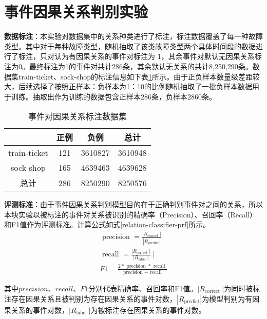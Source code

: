\section{事件因果关系判别实验}
\textbf{数据标注}：本实验对数据集中的关系种类进行了标注，标注数据覆盖了每一种故障类型。其中对于每种故障类型，随机抽取了该类故障类型两个具体时间段的数据进行了标注，只对认为有因果关系的事件对标注为
1，其余事件对默认无因果关系标注为0。最终标注为1的事件对共计286条，其余默认无关系的共计8,250,290‬条。数据集train-ticket、sock-shop的标注信息如下表\ref{event-cause-label}所示。由于正负样本数量级差距较大，后续选择了按照正样本：负样本为1：10的比例随机抽取了一批负样本数据用于训练。抽取出作为训练的数据包含正样本286条，负样本2860条。
\begin{table}[htbp]
    \caption{事件对因果关系标注数据集}
    \centering
    \label{event-cause-label}
    \begin{tabular}{cccc}
    \hline
                 & 正例  & 负例      & 总计      \\ \hline
    train-ticket & 121 & 3610827 & 3610948 \\
    sock-shop    & 165 & 4639463 & 4639628 \\ \hline
    总计           & 286 & 8250290 & 8250576 \\ \hline
    \end{tabular}
    \end{table}

\textbf{评测标准}：由于事件因果关系判别模型目的在于正确判别事件对之间的关系，所以本块实验以被标注的事件对关系被识别的精确率（Precision）、召回率（Recall）和F1值作为评测标准。计算公式如式\ref{relation-classifier-prf}所示。
\begin{equation}
    \begin{array}{c}
    \text { precision }=\frac{\left|R_{\text {correct }}\right|}{|R_{\text {predict}}|} \\
    \text { recall }=\frac{\left|R_{\text {correct }}\right|}{\left|R_{\text {label }}\right|} \mid \\
    F 1=\frac{2 * \text { precision } * \text { recall }}{\text { precision }+\text { recall }}
    \end{array}
    \label{relation-classifier-prf}
\end{equation}

其中$precision$、$recall$、$F1$分别代表精确率、召回率和F1值。$\left|R_{\text {correct }}\right|$为同时被标注存在因果关系且被判别为存在因果关系的事件对数，$|R_{\text {predict}}|$为模型判别为有因果关系的事件对数，$\left|R_{\text {label }}\right|$为被标注存在因果关系的事件对数。


